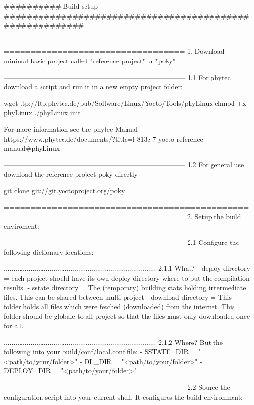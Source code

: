

########## Build setup #########################################################


================================================================================
1.  Download minimal basic project called "reference project" or "poky"

--------------------------------------------------------------------------------
1.1 For phytec download a script and run it in a new empty project folder:

    wget ftp://ftp.phytec.de/pub/Software/Linux/Yocto/Tools/phyLinux
    chmod +x phyLinux
    ./phyLinux init

    For more information see the phytec Manual
    https://www.phytec.de/documents/?title=l-813e-7-yocto-reference-manual#phyLinux


--------------------------------------------------------------------------------
1.2 For general use download the reference project poky directly

    git clone git://git.yoctoproject.org/poky


================================================================================
2.  Setup the build enviroment:

--------------------------------------------------------------------------------
2.1 Configure the following dictionary locations:

................................................................................
2.1.1 What?
    - deploy directory = each project should have its own deploy directory
                        where to put the compilation results.
    - sstate directory = The (temporary) building stats holding intermediate
                        files. This can be shared between multi project
    - download directory = This folder holds all files which were fetched
                            (downloaded) from the internet. This folder should
                            be globale to all project so that the files must
                            only downloaded once for all.


................................................................................
2.1.2 Where?
    But the following into your build/conf/local.conf file:
    - SSTATE_DIR = "<path/to/your/folder>"
    - DL_DIR = "<path/to/your/folder>"
    - DEPLOY_DIR = "<path/to/your/folder>"


--------------------------------------------------------------------------------
2.2 Source the configuration script into your current shell. It configures the
    build environment:

